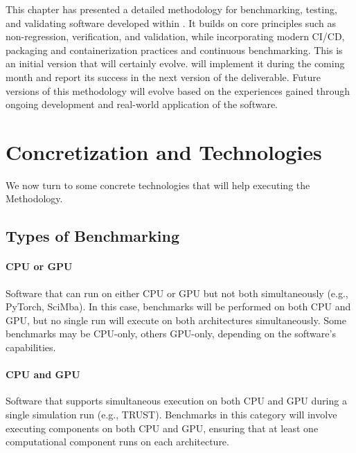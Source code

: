 This chapter has presented a detailed methodology for benchmarking, testing, and validating software developed within \exama. It builds on core principles such as non-regression, verification, and validation, while incorporating modern CI/CD, packaging and containerization practices and continuous benchmarking. 
This is an initial version that will certainly evolve. 
\exama will implement it during the coming month and report its success in the next version of the deliverable.
Future versions of this methodology will evolve based on the experiences gained through ongoing development and real-world application of the \exama software.

\section{Concretization and Technologies}
\label{sec:benchmark:technologies}

We now turn to some concrete technologies that will help executing the Methodology.

\subsection{Types of Benchmarking}
\label{sec:methodology-types}

\paragraph{CPU or GPU}
Software that can run on either CPU or GPU but not both simultaneously (e.g., PyTorch, SciMba). In this case, benchmarks will be performed on both CPU and GPU, but no single run will execute on both architectures simultaneously. Some benchmarks may be CPU-only, others GPU-only, depending on the software's capabilities.

\paragraph{CPU and GPU}
Software that supports simultaneous execution on both CPU and GPU during a single simulation run (e.g., TRUST). Benchmarks in this category will involve executing components on both CPU and GPU, ensuring that at least one computational component runs on each architecture.

